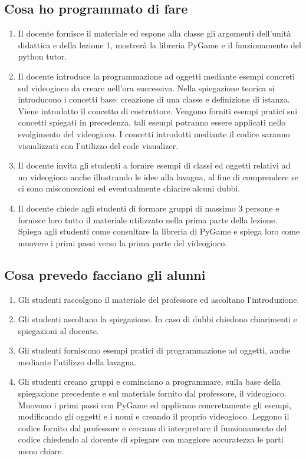 \documentclass[12pt,a4paper]{article}
\begin{document}
\subsection*{Cosa ho programmato di fare}
\begin{enumerate}
	\item Il docente fornisce il materiale ed espone alla classe gli argomenti dell’unità didattica e della lezione 1, mostrerà la libreria PyGame e il funzionamento del python tutor.
	\item Il docente introduce la programmazione ad oggetti mediante esempi concreti sul videogioco da creare nell’ora successiva. Nella spiegazione teorica si introducono i concetti base: creazione di una classe e definizione di istanza. Viene introdotto il concetto di costruttore. Vengono forniti esempi pratici sui concetti spiegati in precedenza, tali esempi potranno essere applicati nello svolgimento del videogioco. I concetti introdotti mediante il codice saranno visualizzati con l’utilizzo del code visualizer.
	\item Il docente invita gli studenti a fornire esempi di classi ed oggetti relativi ad un videogioco anche illustrando le idee alla lavagna, al fine di comprendere se ci sono misconcezioni ed eventualmente chiarire alcuni dubbi.
	\item Il docente chiede agli studenti di formare gruppi di massimo 3 persone e fornisce loro tutto il materiale utilizzato nella prima parte della lezione. Spiega agli studenti come consultare la libreria di PyGame e spiega loro come muovere i primi passi verso la prima parte del videogioco. 
\end{enumerate}
\subsection*{Cosa prevedo facciano gli alunni}

\begin{enumerate}
	\item Gli studenti raccolgono il materiale del professore ed ascoltano l’introduzione.
     \item Gli studenti ascoltano la spiegazione. In caso di dubbi chiedono chiarimenti e spiegazioni al docente.
\item Gli studenti forniscono esempi pratici di programmazione ad oggetti, anche mediante l’utilizzo della lavagna.
\item Gli studenti creano gruppi e cominciano a programmare, sulla base della spiegazione precedente e sul materiale fornito dal professore, il videogioco. Muovono i primi passi con PyGame ed applicano concretamente gli esempi, modificando gli oggetti e i nomi e creando il proprio videogioco. Leggono il codice fornito dal professore e cercano di interpretare il funzionamento del codice chiedendo al docente di spiegare con maggiore accuratezza le parti meno chiare.

\end{enumerate}
\end{document}
